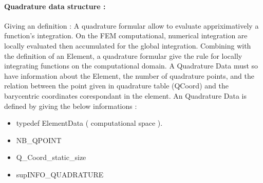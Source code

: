 \documentclass[a4paper,10pt]{article}
\begin{document}
\paragraph{Quadrature data structure : }
Giving an definition : A quadrature formular allow to evaluate appriximatively a function's integration. On the FEM computational, numerical integration are locally evaluated then accumulated for the global integration. Combining with the definition of an Element, a quadrature formular give the rule for locally integrating functions on the computational domain. A Quadrature Data must so have information about the Element, the number of quadrature points, and the relation between the point given in quadrature table (QCoord) and the barycentric coordinates corespondant in the element. An Quadrature Data is defined by giving the below informations : 
\begin{itemize}
 \item typedef ElementData ( computational space ).
 \item NB\_QPOINT
 \item Q\_Coord\_static\_size  
 \item supINFO\_QUADRATURE  
\end{itemize}
\end{document}

